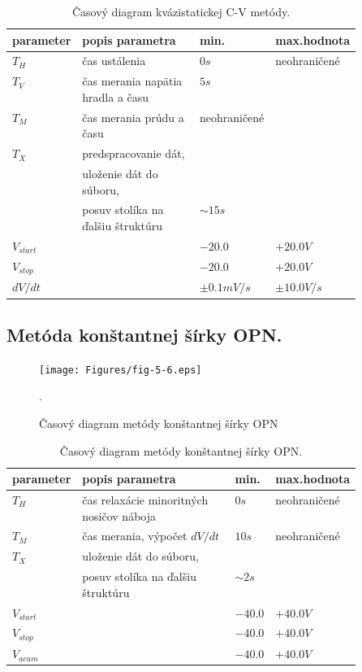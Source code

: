 \begin{table}[h!]\centering
\begin{tabular}{ l p{0.5\linewidth} l l }
\hline
parameter   & popis parametra & min. & max.hodnota \\
\hline
$T_H$  & čas ustálenia \dotfill & $0 s$ & neohraničené \\
$T_V$  & čas merania napätia hradla a času \dotfill & $5 s$ \\
$T_M$  & čas merania prúdu a času \dotfill & neohraničené\\
$T_X$  & predspracovanie dát, \\
       & uloženie dát do súboru, \\
       & posuv stolíka na ďalšiu štruktúru \dotfill & $\sim 15 s$ \\
$V_{start}$ & \dotfill & $-20.0$ & $+20.0 V$ \\
$V_{stop}$ & \dotfill & $-20.0$ & $+20.0 V$ \\
$dV/dt$ & \dotfill & $\pm 0.1mV/s$ & $\pm 10.0V/s$ \\
\hline
\end{tabular}
\caption[Časový diagram kvázistatickej C-V metódy]{Časový diagram
  kvázistatickej C-V metódy.}
\label{tab:5.3}
\end{table}

\newpage
\subsection{Metóda konštantnej šírky OPN.}\label{sec:5.4.4}

\begin{figure}[h!]\centering
\texttt{[image: Figures/fig-5-6.eps]}
\captionsetup{justification=raggedright, singlelinecheck=false}
\caption[Časový diagram metódy konštantnej šírky OPN]{Časový diagram
  metódy konštantnej šírky OPN}.
\label{fig:5.6}
\end{figure}

\begin{table}[h!]\centering
\begin{tabular}{ l p{0.5\linewidth} l l }
\hline
parameter   & popis parametra & min. & max.hodnota \\
\hline
$T_H$ & čas relaxácie minoritných nosičov náboja \dotfill & $0 s$ & neohraničené \\
$T_M$ & čas merania, výpočet $dV/dt$ \dotfill & $10 s$ & neohraničené \\
$T_X$ & uloženie dát do súboru, \\
      & posuv stolíka na ďalšiu štruktúru \dotfill & $\sim 2 s$ \\
$V_{start}$ & \dotfill & $-40.0$ & $+40.0 V$ \\
$V_{stop}$  & \dotfill & $-40.0$ & $+40.0 V$ \\
$V_{acum}$  & \dotfill & $-40.0$ & $+40.0 V$ \\
\hline
\end{tabular}
\caption[Časový diagram metódy konštantnej šírky OPN]{Časový diagram
  metódy konštantnej šírky OPN.}
\label{tab:5.4}
\end{table}


